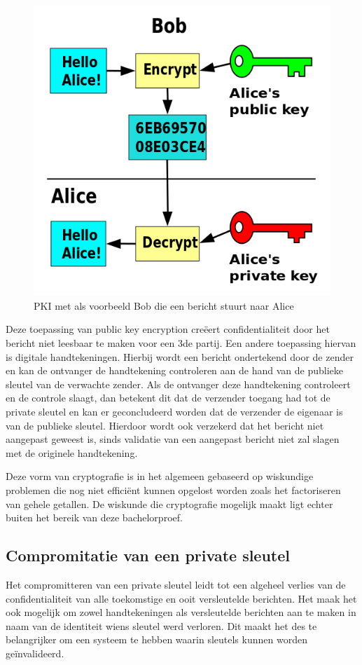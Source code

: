 \begin{figure}[H]
	\includegraphics{img/pki-alice-and-bob}
	\centering
	\caption{\gls{PKI} met als voorbeeld Bob die een bericht stuurt naar Alice}
	\label{fig:pki-alice-and-bob}
\end{figure}

Deze toepassing van public key encryption creëert confidentialiteit door het
bericht niet leesbaar te maken voor een 3de partij. Een andere toepassing
hiervan is digitale handtekeningen. Hierbij wordt een bericht ondertekend door
de zender en kan de ontvanger de handtekening controleren aan de hand van de
publieke sleutel van de verwachte zender. Als de ontvanger deze handtekening
controleert en de controle slaagt, dan betekent dit dat de verzender toegang had
tot de private sleutel en kan er geconcludeerd worden dat de verzender de
eigenaar is van de publieke sleutel. Hierdoor wordt ook verzekerd dat het
bericht niet aangepast geweest is, sinds validatie van een aangepast bericht
niet zal slagen met de originele handtekening.

Deze vorm van cryptografie is in het algemeen gebaseerd op wiskundige problemen
die nog niet efficiënt kunnen opgelost worden zoals het factoriseren van gehele
getallen. De wiskunde die cryptografie mogelijk maakt ligt echter buiten het
bereik van deze bachelorproef.

\subsection{Compromitatie van een private sleutel}
\label{subsec:comprimitatie-van-een-private-sleutel}
Het compromitteren van een private sleutel leidt tot een algeheel verlies van de
confidentialiteit van alle toekomstige en ooit versleutelde berichten. Het maak
het ook mogelijk om zowel handtekeningen als versleutelde berichten aan te maken
in naam van de identiteit wiens sleutel werd verloren. Dit maakt het des te
belangrijker om een systeem te hebben waarin sleutels kunnen worden
geïnvalideerd.


